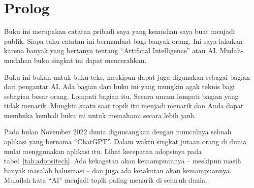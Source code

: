 \chapter{Prolog}
Buku ini merupakan catatan pribadi saya yang kemudian saya buat menjadi publik.
Siapa tahu catatan ini bermanfaat bagi banyak orang.
Ini saya lakukan karena banyak yang bertanya
tentang ``Artificial Intelligence'' atau AI.
Mudah-mudahan buku singkat ini dapat mencerahkan.

Buku ini bukan untuk buku teks, meskipun dapat juga digunakan sebagai
bagian dari pengantar AI.
Ada bagian dari buku ini yang mungkin agak teknis bagi sebagian besar orang.
Lompati bagian itu. Secara umum lompati bagian yang tidak menarik.
Mungkin suatu saat topik itu menjadi menarik dan Anda dapat membuka
kembali buku ini untuk memahami secara lebih jauh.

Pada bulan November 2022 dunia diguncangkan dengan munculnya sebuah
aplikasi yang bernama ``ChatGPT''.
Dalam waktu singkat jutaan orang di dunia mulai menggunakan aplikasi itu.
Lihat kecepatan adopsinya pada tabel~\ref{tab:adopsitech}.
Ada kekagetan akan kemampuannya -- meskipun masih banyak masalah halusinasi --
dan juga ada ketakutan akan kemampuannya.
Mulailah kata ``AI'' menjadi topik paling menarik di seluruh dunia.


